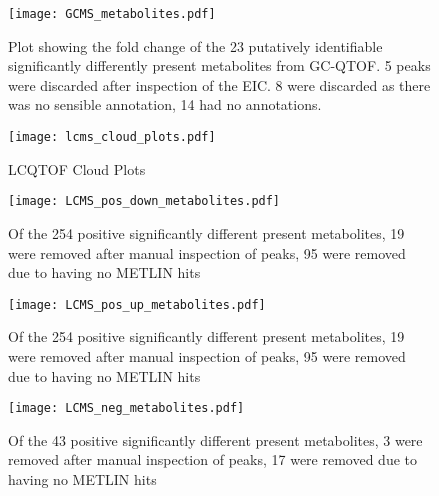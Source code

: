 \begin{figure}
    \centering
    \texttt{[image: GCMS\_metabolites.pdf]}
    \caption[Plot of Identifiable GC-QTOF Metabolites]{Plot showing the
        fold change of the 23 putatively identifiable significantly
        differently present metabolites from GC-QTOF. 5 peaks
        were discarded after inspection of the EIC. 8 were discarded
    as there was no sensible annotation, 14 had no annotations.}
    \label{fig:gcms_metabolites}
\end{figure}



\begin{figure}
    \centering
    \texttt{[image: lcms\_cloud\_plots.pdf]}
    \caption[LCQTOF Cloud Plots]{LCQTOF Cloud Plots}
    \label{fig:lcms_clouds}
\end{figure}


\begin{figure}
    \centering
    \texttt{[image: LCMS\_pos\_down\_metabolites.pdf]}
    \caption{Of the 254 positive significantly different present metabolites,
        19 were removed after manual inspection of peaks, 95 were removed due
    to having no METLIN hits}
    \label{fig:posqtofdown}
\end{figure}


\begin{figure}
    \centering
    \texttt{[image: LCMS\_pos\_up\_metabolites.pdf]}
    \caption{Of the 254 positive significantly different present metabolites,
        19 were removed after manual inspection of peaks, 95 were removed due
    to having no METLIN hits}
    \label{fig:posqtofup}
\end{figure}


\begin{figure}
    \centering
    \texttt{[image: LCMS\_neg\_metabolites.pdf]}
    \caption{Of the 43 positive significantly different present metabolites,
        3 were removed after manual inspection of peaks, 17 were removed due
    to having no METLIN hits}
    \label{fig:poslcqtof}
\end{figure}


%
%
%
%
%
%
%
%
%




